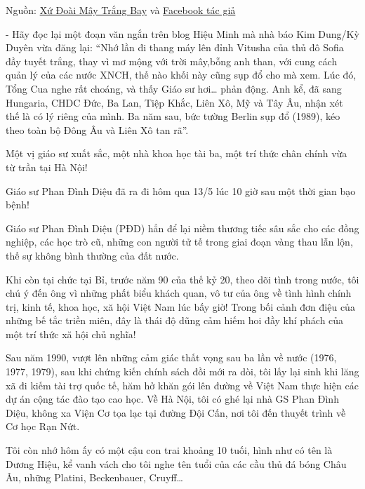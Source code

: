 
Nguồn: \href{https://anlacminh.blogspot.com/2018/05/gs-dieu-va-nhung-tien-tri-chinh-tri.html}{Xứ Đoài Mây Trắng Bay} và 
 \href{https://www.facebook.com/h.nguyendang/posts/10156546582764736}{Facebook tác giả}




- Hãy đọc lại một đoạn văn ngắn trên blog Hiệu Minh mà nhà báo Kim Dung/Kỳ Duyên vừa đăng lại: “Nhớ lần đi thang máy lên đỉnh Vitusha của thủ đô Sofia đầy tuyết trắng, thay vì mơ mộng với trời mây,bỗng anh than, với cung cách quản lý của các nước XNCH, thế nào khối này cũng sụp đổ cho mà xem. Lúc đó, Tổng Cua nghe rất choáng, và thấy Giáo sư hơi… phản động. Anh kể, đã sang Hungaria, CHDC Đức, Ba Lan, Tiệp Khắc, Liên Xô, Mỹ và Tây Âu, nhận xét thế là có lý riêng của mình. Ba năm sau, bức tường Berlin sụp đổ (1989), kéo theo toàn bộ Đông Âu và Liên Xô tan rã”.

Một vị giáo sư xuất sắc, một nhà khoa học tài ba, một trí thức chân chính vừa từ trần tại Hà Nội!

Giáo sư Phan Đình Diệu đã ra đi hôm qua 13/5 lúc 10 giờ sau một thời gian bạo bệnh!

Giáo sư Phan Đình Diệu (PĐD) hẳn để lại niềm thương tiếc sâu sắc cho các đồng nghiệp, các học trò cũ, những con người tử tế trong giai đoạn vàng thau lẫn lộn, thế sự không bình thường của đất nước.

 Khi còn tại chức tại Bỉ, trước năm 90 của thế kỷ 20, theo dõi tình trong nước, tôi chú ý đến ông vì những phất biểu khách quan, vô tư của ông về tình hình chính trị, kinh tế, khoa học, xă hội Việt Nam lúc bấy giờ! Trong bối cảnh đơn điệu của những bế tắc triền miên, đây là thái độ dũng cảm hiếm hoi đầy khí phách của một trí thức xă hội chủ nghĩa!
 
Sau năm 1990, vượt lên những cảm giác thất vọng sau ba lần về nước (1976, 1977, 1979), sau khi chứng kiến chính sách đồi mới ra dòi, tôi lấy lại sinh khi lăng xã đi kiếm tài trợ quốc tế, hăm hở khăn gói lên đường về Việt Nam  thực hiện các dự án cộng tác đào tạo cao học.  Về Hà Nội, tôi có ghé lại nhà GS Phan Đình Diệu, không xa Viện Cơ tọa lạc tại đường Đội Cấn, nơi tôi đến thuyết trình về Cơ học Rạn Nứt. 

Tôi còn nhớ hôm ấy có một cậu con trai khoảng 10 tuối, hình như có tên là Dương Hiệu, kể vanh vách cho tôi nghe tên tuổi của các cầu thủ đá bóng Châu Âu, những Platini, Beckenbauer, Cruyff…

